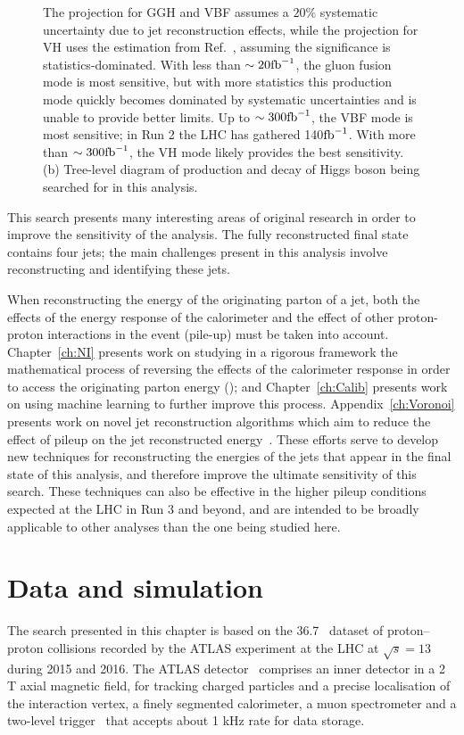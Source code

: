\begin{figure}[t]
{    The projection for GGH and VBF assumes a $20\%$ systematic uncertainty due to jet reconstruction effects, while the projection for VH uses the estimation from Ref.~\cite{hep-ph/0703247}, assuming the significance is statistics-dominated.
    With less than $\sim 20 \mathrm{fb}^{-1}$, the gluon fusion mode is most sensitive, but with more statistics this production mode quickly becomes dominated by systematic uncertainties and is unable to provide better limits.
    Up to $\sim 300 \mathrm{fb}^{-1}$, the VBF mode is most sensitive; in Run 2 the LHC has gathered 140$\mathrm{fb}^{-1}$.
    With more than $\sim 300 \mathrm{fb}^{-1}$, the VH mode likely provides the best sensitivity.
    (b) Tree-level diagram of production and decay of Higgs boson being searched for in this analysis.
    }
\end{figure}

This search presents many interesting areas of original research in order to improve the sensitivity of the analysis.
The fully reconstructed final state contains four jets;
the main challenges present in this analysis involve reconstructing and identifying these jets.

When reconstructing the energy of the originating parton of a jet, both the effects of the energy response of the calorimeter and the effect of other proton-proton interactions in the event (pile-up) must be taken into account.
Chapter~\ref{ch:NI} presents work on studying in a rigorous framework the mathematical process of reversing the effects of the calorimeter response in order to access the originating parton energy (\cite{Cukierman:2016dkb});
and Chapter~\ref{ch:Calib} presents work on using machine learning to further improve this process.
Appendix~\ref{ch:Voronoi} presents work on novel jet reconstruction algorithms which aim to reduce the effect of pileup on the jet reconstructed energy~\cite{ATLAS-CONF-2017-065}.
These efforts serve to develop new techniques for reconstructing the energies of the jets that appear in the final state of this analysis, and therefore improve the ultimate sensitivity of this search.
These techniques can also be effective in the higher pileup conditions expected at the LHC in Run 3 and beyond, and are intended to be broadly applicable to other analyses than the one being studied here. 

\section{Data and simulation}

The search presented in this chapter is based on the 36.7~\ifb{} dataset of proton--proton collisions
recorded by the ATLAS experiment at the LHC at $\sqrt{s}=13$ \TeV{} during 2015 and 2016.
The ATLAS detector~\cite{PERF-2007-01} comprises an inner detector in a 2 T axial magnetic field, 
for tracking charged particles and a precise localisation of the interaction vertex, 
a finely segmented calorimeter, a muon spectrometer and a two-level trigger~\cite{TRIG-2016-01} that
accepts about 1 kHz rate for data storage.

